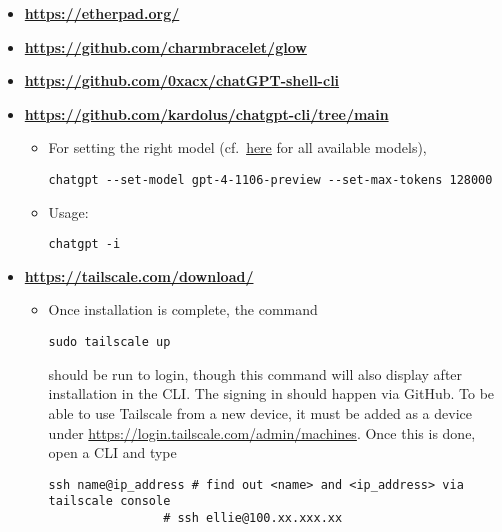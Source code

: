 \documentclass[12pt, a4paper]{scrbook}
\numberwithin{equation}{section}
\theoremstyle{definition}
\theoremstyle{definition}
\begin{document}
	\begin{itemize}
		\item \textbf{\url{https://etherpad.org/}}

		\item \textbf{\url{https://github.com/charmbracelet/glow}}
		
		\item \textbf{\url{https://github.com/0xacx/chatGPT-shell-cli}}
		
		\item \textbf{\url{https://github.com/kardolus/chatgpt-cli/tree/main}}	
		
		\begin{itemize}
			\item For setting the right model (cf.~\href{https://platform.openai.com/docs/models/gpt-4-and-gpt-4-turbo}{here} for all available models), 
			
			\begin{lstlisting}[style=mystylebash, label=alg:chatgpt_set_model, xleftmargin=\parindent]
				chatgpt --set-model gpt-4-1106-preview --set-max-tokens 128000
			\end{lstlisting}

			\item Usage:

			\begin{lstlisting}[style=mystylebash, label=alg:chatgpt_usage, xleftmargin=\parindent]
				chatgpt -i
			\end{lstlisting}
		\end{itemize}

		\item \textbf{\url{https://tailscale.com/download/}}
		
		\begin{itemize}
			\item Once installation is complete, the command 
			
			\begin{lstlisting}[style=mystylepython, label=alg:tailscale_login, xleftmargin=\parindent]
				sudo tailscale up
			\end{lstlisting}
		
			should be run to login, though this command will also display after installation in the CLI. The signing in should happen via GitHub. To be able to use Tailscale from a new device, it must be added as a device under \url{https://login.tailscale.com/admin/machines}. Once this is done, open a CLI and type 
			
			\begin{lstlisting}[style=mystylepython, label=alg:tailscale_connec, xleftmargin=\parindent]
				ssh name@ip_address # find out <name> and <ip_address> via tailscale console
				# ssh ellie@100.xx.xxx.xx
			\end{lstlisting}
		

\end{itemize}
\end{itemize}
\end{document}
